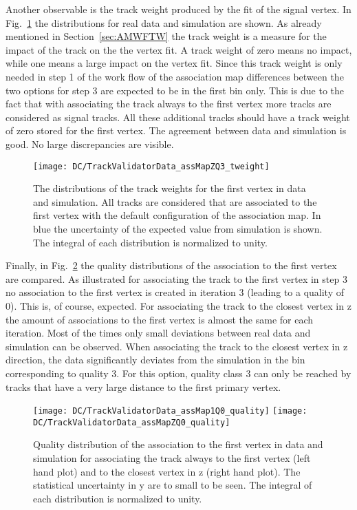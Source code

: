 Another observable is the track weight produced by the fit of the signal vertex. In Fig.~\ref{plot:DCTVTW} the distributions for real data and simulation are shown. As already mentioned in Section~\ref{sec:AMWFTW} the track weight is a measure for the impact of the track on the the vertex fit. A track weight of zero means no impact, while one means a large impact on the vertex fit. Since this track weight is only needed in step 1 of the work flow of the association map differences between the two options for step 3 are expected to be in the first bin only. This is due to the fact that with associating the track always to the first vertex more tracks are considered as signal tracks. All these additional tracks should have a track weight of zero stored for the first vertex. The agreement between data and simulation is good. No large discrepancies are visible.

\begin{figure}[Ht]
  \centering
  \texttt{[image: DC/TrackValidatorData\_assMapZQ3\_tweight]}
  \caption[Distribution of the track weights for the first vertex in data and simulation]{The distributions of the track weights for the first vertex in data and simulation. All tracks are considered that are associated to the first vertex with the default configuration of the association map. In blue the uncertainty of the expected value from simulation is shown. The integral of each distribution is normalized to unity. \label{plot:DCTVTW}}
\end{figure}

Finally, in Fig.~\ref{plot:DCTVTCQuality} the quality distributions of the association to the first vertex are compared. As illustrated for associating the track to the first vertex in step 3 no association to the first vertex is created in iteration 3 (leading to a quality of 0). This is, of course, expected. For associating the track to the closest vertex in z the amount of associations to the first vertex is almost the same for each iteration. Most of the times only small deviations between real data and simulation can be observed. When associating the track to the closest vertex in z direction, the data significantly deviates from the simulation in the bin corresponding to quality 3. For this option, quality class 3 can only be reached by tracks that have a very large distance to the first primary vertex.

\begin{figure}[Ht]
  \centering
  \texttt{[image: DC/TrackValidatorData\_assMap1Q0\_quality]}
  \texttt{[image: DC/TrackValidatorData\_assMapZQ0\_quality]}
  \caption[Quality distribution of the association to the first vertex in data and simulation]{Quality distribution of the association to the first vertex in data and simulation for associating the track always to the first vertex (left hand plot) and to the closest vertex in z (right hand plot). The statistical uncertainty in y are to small to be seen. The integral of each distribution is normalized to unity.\label{plot:DCTVTCQuality}}
\end{figure}

